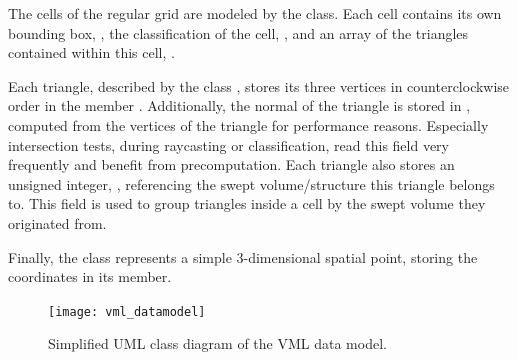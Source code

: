 The cells of the regular grid are modeled by the  class.
Each cell contains its own bounding box, , the classification of the cell, , and an array of the triangles contained within this cell, .

Each triangle, described by the class , stores its three vertices in counterclockwise order in the member .
Additionally, the normal of the triangle is stored in , computed from the vertices of the triangle for performance reasons.
Especially intersection tests, \eg during raycasting or classification, read this field very frequently and benefit from precomputation.
Each triangle also stores an unsigned integer, , referencing the swept volume/structure this triangle belongs to.
This field is used to group triangles inside a cell by the swept volume they originated from.

Finally, the  class represents a simple 3-dimensional spatial point, storing the coordinates in its  member.

\begin{figure}
	\centering
	\texttt{[image: vml\_datamodel]}
	\caption[VML UML class diagram]{
		Simplified UML class diagram of the VML data model.
	}
	\label{fig:vml_datamodel}
\end{figure}

